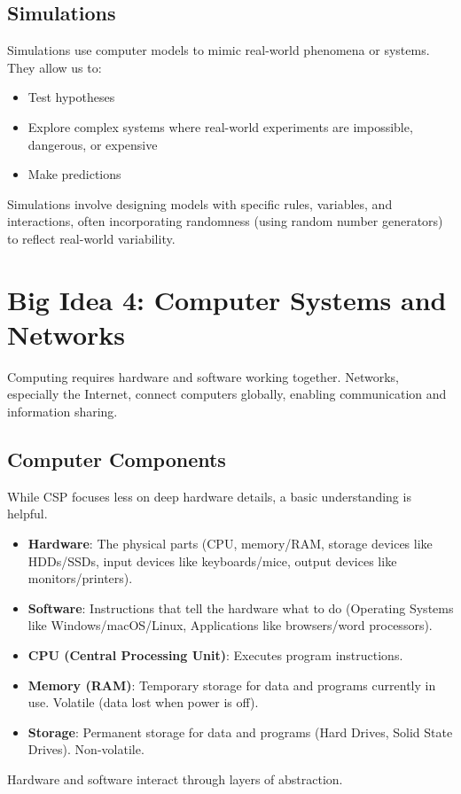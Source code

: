 \documentclass[11pt,oneside]{book}
\begin{document}
\section{Simulations}
\label{sec:simulations}
Simulations use computer models to mimic real-world phenomena or systems. They allow us to:
\begin{itemize}
    \item Test hypotheses
    \item Explore complex systems where real-world experiments are impossible, dangerous, or expensive
    \item Make predictions
\end{itemize}
Simulations involve designing models with specific rules, variables, and interactions, often incorporating randomness (using random number generators) to reflect real-world variability.

\chapter{Big Idea 4: Computer Systems and Networks}
\label{chap:systems_networks}
Computing requires hardware and software working together. Networks, especially the Internet, connect computers globally, enabling communication and information sharing.

\section{Computer Components}
\label{sec:computer_components}
While CSP focuses less on deep hardware details, a basic understanding is helpful.
\begin{itemize}
    \item \textbf{Hardware}: The physical parts (CPU, memory/RAM, storage devices like HDDs/SSDs, input devices like keyboards/mice, output devices like monitors/printers).
    \item \textbf{Software}: Instructions that tell the hardware what to do (Operating Systems like Windows/macOS/Linux, Applications like browsers/word processors).
    \item \textbf{CPU (Central Processing Unit)}: Executes program instructions.
    \item \textbf{Memory (RAM)}: Temporary storage for data and programs currently in use. Volatile (data lost when power is off).
    \item \textbf{Storage}: Permanent storage for data and programs (Hard Drives, Solid State Drives). Non-volatile.
\end{itemize}
Hardware and software interact through layers of abstraction.
\end{document}
